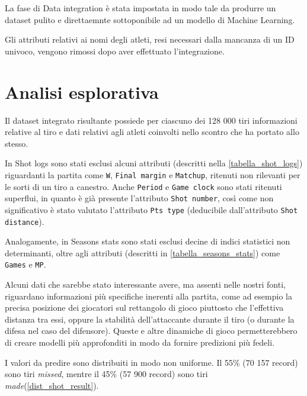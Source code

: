 La fase di Data integration è stata impostata in modo tale da produrre un dataset pulito e direttaemnte sottoponibile ad un modello di Machine Learning.

Gli attributi relativi ai nomi degli atleti, resi necessari dalla mancanza di un ID univoco, vengono rimossi dopo aver effettuato l'integrazione.

\section{Analisi esplorativa}

\par
Il dataset integrato risultante possiede per ciascuno dei 128 000 tiri informazioni relative al tiro e dati relativi agli atleti coinvolti nello scontro che ha portato allo stesso.
\par

In Shot logs sono stati esclusi alcuni attributi (descritti nella \autoref{tabella_shot_logs}) riguardanti la partita come \texttt{W}, \texttt{Final margin} e \texttt{Matchup}, ritenuti non rilevanti per le sorti di un tiro a canestro.
Anche \texttt{Period} e \texttt{Game clock} sono stati ritenuti superflui, in quanto è già presente l'attributo \texttt{Shot number}, così come non significativo è stato valutato l'attributo \texttt{Pts type} (deducibile dall'attributo \texttt{Shot distance}). 
\par
Analogamente, in Seasons stats sono stati esclusi decine di indici statistici non determinanti, oltre agli attributi (descritti in \autoref{tabella_seasons_stats}) come \texttt{Games} e \texttt{MP}.

\par

Alcuni dati che sarebbe stato interessante avere, ma assenti nelle nostri fonti, riguardano informazioni più specifiche inerenti alla partita, come ad esempio la precisa posizione dei giocatori sul rettangolo di gioco piuttosto che l’effettiva distanza tra essi, oppure la stabilità dell’attaccante durante il tiro (o durante la difesa nel caso del difensore). Queste e altre dinamiche di gioco permetterebbero di creare modelli più approfonditi in modo da fornire predizioni più fedeli.

\par
I valori da predire sono distribuiti in modo non uniforme. Il 55\% (70 157 record) sono tiri \textit{missed}, mentre il 45\% (57 900 record) sono tiri \textit{made}(\autoref{dist_shot_result}).

